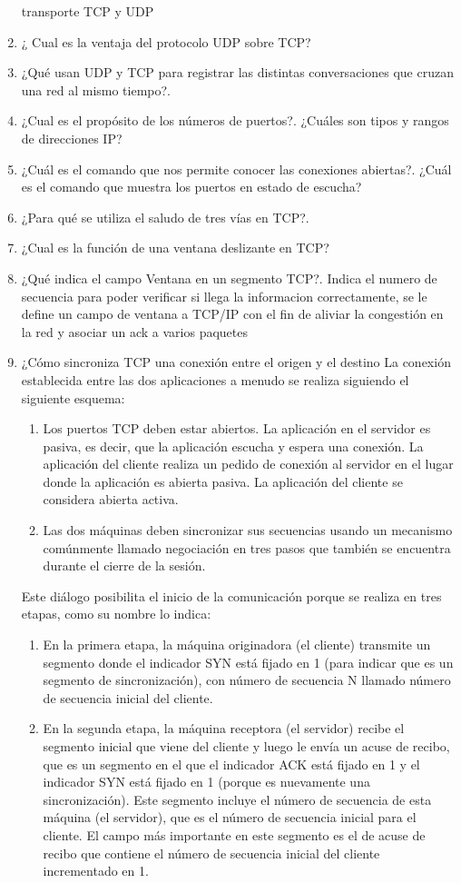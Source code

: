 \documentclass{udparticle}
\begin{document}
\begin{enumerate}
transporte TCP y UDP
\item ¿ Cual es la ventaja del protocolo UDP sobre TCP?
\item ¿Qué usan UDP y TCP para registrar las distintas conversaciones 
que cruzan una red al mismo tiempo?.
\item ¿Cual es el propósito de los números de puertos?. ¿Cuáles son 
tipos y rangos de direcciones IP?
\item ¿Cuál es el comando que nos permite conocer las conexiones 
abiertas?. 
¿Cuál es el comando que muestra los puertos en estado de escucha?
\item ¿Para qué se utiliza el saludo de tres vías en TCP?.
\item ¿Cual es la función de una ventana deslizante en TCP?
\item ¿Qué indica el campo Ventana en un segmento TCP?.
Indica el numero de secuencia para poder verificar si llega la informacion correctamente,
se le define un campo de ventana a TCP/IP con el fin de aliviar la congestión en la red y asociar un ack a varios paquetes
\item ¿Cómo sincroniza TCP una conexión entre el origen y el destino 
La conexión establecida entre las dos aplicaciones a menudo se realiza siguiendo el siguiente esquema:
\begin{enumerate}
\item Los puertos TCP deben estar abiertos.
La aplicación en el servidor es pasiva, es decir, que la aplicación escucha y espera una conexión.
La aplicación del cliente realiza un pedido de conexión al servidor en el lugar donde la aplicación es abierta pasiva. La aplicación del cliente se considera abierta activa.
\item
Las dos máquinas deben sincronizar sus secuencias usando un mecanismo comúnmente llamado negociación en tres pasos que también se encuentra durante el cierre de la sesión.
\end{enumerate}
Este diálogo posibilita el inicio de la comunicación porque se realiza en tres etapas, como su nombre lo indica:
\begin{enumerate}
\item En la primera etapa, la máquina originadora (el cliente) transmite un segmento donde el indicador SYN está fijado en 1 (para indicar que es un segmento de sincronización), con número de secuencia N llamado número de secuencia inicial del cliente.
\item En la segunda etapa, la máquina receptora (el servidor) recibe el segmento inicial que viene del cliente y luego le envía un acuse de recibo, que es un segmento en el que el indicador ACK está fijado en 1 y el indicador SYN está fijado en 1 (porque es nuevamente una sincronización). Este segmento incluye el número de secuencia de esta máquina (el servidor), que es el número de secuencia inicial para el cliente. El campo más importante en este segmento es el de acuse de recibo que contiene el número de secuencia inicial del cliente incrementado en 1.

\end{enumerate}
\end{enumerate}
\end{document}
